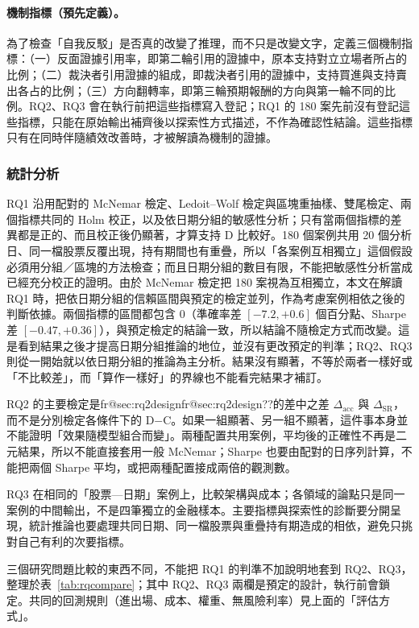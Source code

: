 \documentclass[12pt,a4paper]{article}
\makeatletter
\numberwithin{table}{section}
\numberwithin{figure}{section}
\newcommand{\frref}[1]{\ifcsname fr@#1\endcsname\csname fr@#1\endcsname\else ??\fi}
\makeatother
\begin{document}
\paragraph{機制指標（預先定義）。} 為了檢查「自我反駁」是否真的改變了推理，而不只是改變文字，定義三個機制指標：（一）反面證據引用率，即第二輪引用的證據中，原本支持對立立場者所占的比例；（二）裁決者引用證據的組成，即裁決者引用的證據中，支持買進與支持賣出各占的比例；（三）方向翻轉率，即第三輪預期報酬的方向與第一輪不同的比例。RQ2、RQ3 會在執行前把這些指標寫入登記；RQ1 的 180 案先前沒有登記這些指標，只能在原始輸出補齊後以探索性方式描述，不作為確認性結論。這些指標只有在同時伴隨績效改善時，才被解讀為機制的證據。

\subsubsection{統計分析}

RQ1 沿用配對的 McNemar 檢定、Ledoit--Wolf 檢定與區塊重抽樣、雙尾檢定、兩個指標共同的 Holm 校正，以及依日期分組的敏感性分析；只有當兩個指標的差異都是正的、而且校正後仍顯著，才算支持 D 比較好。180 個案例共用 20 個分析日、同一檔股票反覆出現，持有期間也有重疊，所以「各案例互相獨立」這個假設必須用分組／區塊的方法檢查；而且日期分組的數目有限，不能把敏感性分析當成已經充分校正的證明。由於 McNemar 檢定把 180 案視為互相獨立，本文在解讀 RQ1 時，把依日期分組的信賴區間與預定的檢定並列，作為考慮案例相依之後的判斷依據。兩個指標的區間都包含 0（準確率差 $[-7.2,+0.6]$ 個百分點、Sharpe 差 $[-0.47,+0.36]$），與預定檢定的結論一致，所以結論不隨檢定方式而改變。這是看到結果之後才提高日期分組推論的地位，並沒有更改預定的判準；RQ2、RQ3 則從一開始就以依日期分組的推論為主分析。結果沒有顯著，不等於兩者一樣好或「不比較差」，而「算作一樣好」的界線也不能看完結果才補訂。

RQ2 的主要檢定是\frref{sec:rq2design}的差中之差 $\Delta_{\mathrm{acc}}$ 與 $\Delta_{\mathrm{SR}}$，而不是分別檢定各條件下的 D$-$C。如果一組顯著、另一組不顯著，這件事本身並不能證明「效果隨模型組合而變」。兩種配置共用案例，平均後的正確性不再是二元結果，所以不能直接套用一般 McNemar；Sharpe 也要由配對的日序列計算，不能把兩個 Sharpe 平均，或把兩種配置接成兩倍的觀測數。

RQ3 在相同的「股票—日期」案例上，比較架構與成本；各領域的論點只是同一案例的中間輸出，不是四筆獨立的金融樣本。主要指標與探索性的診斷要分開呈現，統計推論也要處理共同日期、同一檔股票與重疊持有期造成的相依，避免只挑對自己有利的次要指標。

三個研究問題比較的東西不同，不能把 RQ1 的判準不加說明地套到 RQ2、RQ3，整理於表~\ref{tab:rqcompare}；其中 RQ2、RQ3 兩欄是預定的設計，執行前會鎖定。共同的回測規則（進出場、成本、權重、無風險利率）見上面的「評估方式」。
\end{document}
